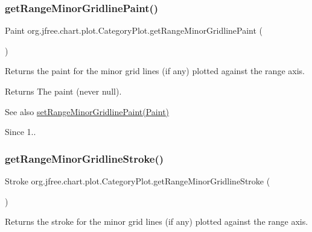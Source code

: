 \subsubsection{\texorpdfstring{get\+Range\+Minor\+Gridline\+Paint()}{getRangeMinorGridlinePaint()}}
{\footnotesize\ttfamily Paint org.\+jfree.\+chart.\+plot.\+Category\+Plot.\+get\+Range\+Minor\+Gridline\+Paint (\begin{DoxyParamCaption}{ }\end{DoxyParamCaption})}

Returns the paint for the minor grid lines (if any) plotted against the range axis.

\begin{DoxyReturn}{Returns}
The paint (never {\ttfamily null}).
\end{DoxyReturn}
\begin{DoxySeeAlso}{See also}
\mbox{\hyperlink{classorg_1_1jfree_1_1chart_1_1plot_1_1_category_plot_ab73c99285bb575885f993a91f32d25b9}{set\+Range\+Minor\+Gridline\+Paint(\+Paint)}}
\end{DoxySeeAlso}
\begin{DoxySince}{Since}
1.. 
\end{DoxySince}
\mbox{\label{classorg_1_1jfree_1_1chart_1_1plot_1_1_category_plot_aecf2eb95c22f637734856931ed842527}} 
\subsubsection{\texorpdfstring{get\+Range\+Minor\+Gridline\+Stroke()}{getRangeMinorGridlineStroke()}}
{\footnotesize\ttfamily Stroke org.\+jfree.\+chart.\+plot.\+Category\+Plot.\+get\+Range\+Minor\+Gridline\+Stroke (\begin{DoxyParamCaption}{ }\end{DoxyParamCaption})}

Returns the stroke for the minor grid lines (if any) plotted against the range axis.

